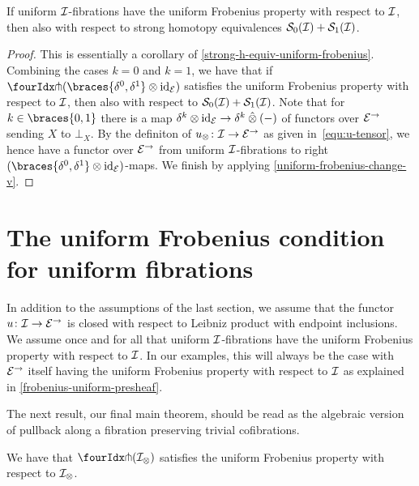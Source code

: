 \documentclass[reqno,10pt,a4paper,oneside,draft]{amsart}
\begin{document}
\begin{proposition} \label{strong-h-equiv-uniform-frobenius-fibrations}
If uniform $\cal{I}$-fibrations have the uniform Frobenius property with respect to $\cal{I}$, then also with respect to strong homotopy equivalences $\cal{S}_0(\cal{I}) + \cal{S}_1(\cal{I})$.
\end{proposition}

\begin{proof}
This is essentially a corollary of \cref{strong-h-equiv-uniform-frobenius}.
Combining the cases $k = 0$ and $k = 1$, we have that if $\liftr{(\braces{\lcyl, \rcyl} \otimes \id_\catE)}$ satisfies the uniform Frobenius property with respect to $\cal{I}$, then also with respect to $\cal{S}_0(\cal{I}) + \cal{S}_1(\cal{I})$.
Note that for $k \in \braces{0, 1}$ there is a map $\delta^k \otimes \id_\catE \to \delta^k \hatotimes (-)$ of functors over $\catE^\to$ sending $X$ to $\bot_X$.
By the definiton of $u_\otimes \co \cal{I} \to \catE^\to$ as given in~\eqref{equ:u-tensor}, we hence have a functor over $\catE^\to$ from uniform $\cal{I}$-fibrations to right $(\braces{\lcyl, \rcyl} \otimes \id_\catE)$-maps.
We finish by applying \cref{uniform-frobenius-change-v}.
\end{proof}

\section{The uniform Frobenius condition for uniform fibrations}
\label{sec:frocuf}

In addition to the assumptions of the last section, we assume that the functor $u \co \cal{I} \to \catE^\to$ is closed with respect to Leibniz product with endpoint inclusions.
We assume once and for all that uniform $\cal{I}$-fibrations have the uniform Frobenius property with respect to $\cal{I}$.
In our examples, this will always be the case with $\catE^\to$ itself having the uniform Frobenius property with respect to $\cal{I}$ as explained in \cref{frobenius-uniform-presheaf}.

The next result, our final main theorem, should be read as the algebraic version of pullback along a fibration preserving trivial cofibrations.

\begin{theorem} \label{uniform-fibrations-uniform-frobenius}
We have that $\liftr{(\cal{I}_{\otimes})}$ satisfies the uniform Frobenius property with respect to $\cal{I}_{\otimes}$.
\end{theorem}
\end{document}
